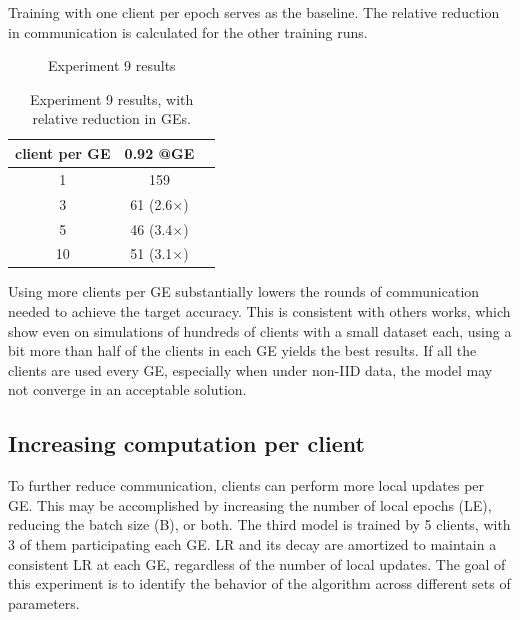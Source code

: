 Training with one client per epoch serves as the baseline. The relative reduction in communication is calculated for the other training runs.

\begin{figure}[H]
    \center
    
    \caption[Experiment 9 results]{Experiment 9 results}
    \label{fig:Experiment 9 results}
\end{figure}

\begin{table}[H]
\center
    \begin{tabular}{ | c | c | c | }
        \hline
        client per GE & 0.92 @GE\\\hline
        1 & 159\\\hline
        3 & 61 (2.6$\times$)\\\hline
        5 & 46 (3.4$\times$)\\\hline
        10 & 51 (3.1$\times$)\\\hline
    \end{tabular}
    \caption[Experiment 9 results]{Experiment 9 results, with relative reduction in GEs.}
\end{table}
    
Using more clients per GE substantially lowers the rounds of communication needed to achieve the target accuracy. This is consistent with others works, which show even on simulations of hundreds of clients with a small dataset each, using a bit more than half of the clients in each GE yields the best results. If all the clients are used every GE, especially when under non-IID data, the model may not converge in an acceptable solution.
    
\subsection{Increasing computation per client}
To further reduce communication, clients can perform more local updates per GE. This may be accomplished by increasing the number of local epochs (LE), reducing the batch size (B), or both. The third model is trained by 5 clients, with 3 of them participating each GE. LR and its decay are amortized to maintain a consistent LR at each GE, regardless of the number of local updates. The goal of this experiment is to identify the behavior of the algorithm across different sets of parameters.

